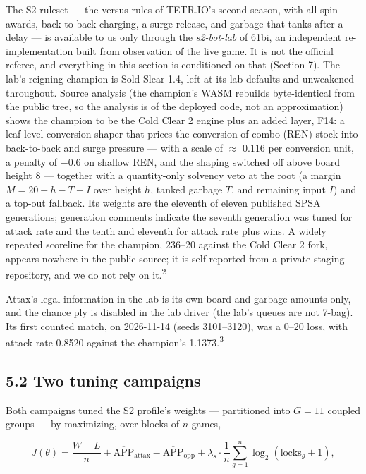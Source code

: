 \documentclass[
  11pt,
]{article}
\begin{document}
The S2 ruleset --- the versus rules of TETR.IO's second season, with
all-spin awards, back-to-back charging, a surge release, and garbage
that tanks after a delay --- is available to us only through the
\emph{s2-bot-lab} of 61bi, an independent re-implementation built from
observation of the live game. It is not the official referee, and
everything in this section is conditioned on that (Section 7). The lab's
reigning champion is Sold Slear 1.4, left at its lab defaults and
unweakened throughout. Source analysis (the champion's WASM rebuilds
byte-identical from the public tree, so the analysis is of the deployed
code, not an approximation) shows the champion to be the Cold Clear 2
engine plus an added layer, F14: a leaf-level conversion shaper that
prices the conversion of combo (REN) stock into back-to-back and surge
pressure --- with a scale of \(\approx\) 0.116 per conversion unit, a penalty of
\(-\)0.6 on shallow REN, and the shaping switched off above board height 8
--- together with a quantity-only solvency veto at the root (a margin
\(M = 20 - h - T -
I\) over height \(h\), tanked garbage \(T\), and remaining input \(I\))
and a top-out fallback. Its weights are the eleventh of eleven published
SPSA generations; generation comments indicate the seventh generation
was tuned for attack rate and the tenth and eleventh for attack rate
plus wins. A widely repeated scoreline for the champion, 236--20 against
the Cold Clear 2 fork, appears nowhere in the public source; it is
self-reported from a private staging repository, and we do not rely on
it.\textsuperscript{2}

Attax's legal information in the lab is its own board and garbage
amounts only, and the chance ply is disabled in the lab driver (the
lab's queues are not 7-bag). Its first counted match, on 2026-11-14
(seeds 3101--3120), was a 0--20 loss, with attack rate 0.8520 against
the champion's 1.1373.\textsuperscript{3}

\subsection{5.2 Two tuning campaigns}\label{two-tuning-campaigns}

Both campaigns tuned the S2 profile's weights --- partitioned into
\(G = 11\) coupled groups --- by maximizing, over blocks of \(n\) games,

\begin{equation}J(\theta) = \frac{W - L}{n} + \overline{\mathrm{APP}}_{\mathrm{attax}} - \overline{\mathrm{APP}}_{\mathrm{opp}} + \lambda_s \cdot \frac{1}{n} \sum_{g=1}^{n} \log_2(\mathrm{locks}_g + 1),
\end{equation}
\end{document}
